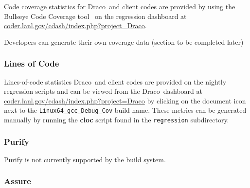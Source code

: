 \documentclass[11pt]{nmemo}
\newcommand{\comp}[1]{\normalfont\footnotesize\texttt{#1}\normalsize}
\newcommand{\draco}{{\normalfont\sffamily Draco}}
\begin{document}
Code coverage statistics for \draco\ and client codes are provided by
using the Bullseye Code Coverage tool~\cite{bullseyeweb} on the
regression dashboard at
\url{coder.lanl.gov/cdash/index.php?project=Draco}.  

Developers can generate their own coverage data (section to be
completed later)

\subsubsection{Lines of Code}

Lines-of-code statistics \draco\ and client codes are provided on the
nightly regression scripts and can be viewed from the
\draco\ dashboard at
\url{coder.lanl.gov/cdash/index.php?project=Draco} by clicking on the
document icon next to the \comp{Linux64\_gcc\_Debug\_Cov} build
name.  These metrics can be generated manually by running the
\textbf{cloc} script found in the \comp{regression} subdirectory.

\subsubsection{Purify}

Purify is not currently supported by the build system.




\subsubsection{Assure}
\end{document}
